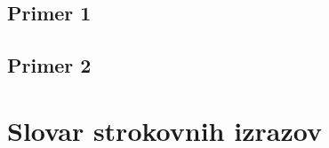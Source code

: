 \documentclass[mat1]{fmfdelo}
\begin{document}
\subsection{Primer 1}
\subsection{Primer 2}


\section*{Slovar strokovnih izrazov}

\geslo{}{}
\geslo{}{}

\begin{thebibliography}{99}


\end{thebibliography}
\end{document}
